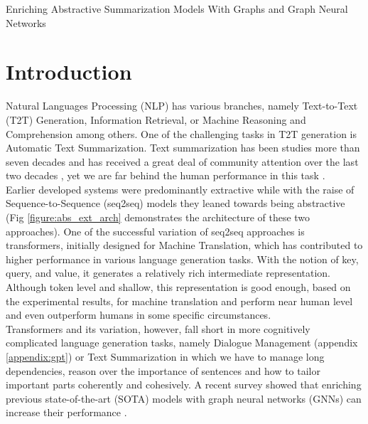 \documentclass[12pt,onecolumn,a4paper]{article}
\begin{document}
\title{\vspace{-5ex}}
\date{\vspace{-5ex}}
\author{\vspace{-5ex}}
\maketitle
\begin{center}
    Enriching Abstractive Summarization Models With Graphs and Graph Neural Networks
\end{center}

\section{Introduction}

Natural Languages Processing (NLP) has various branches, namely Text-to-Text (T2T) Generation, Information Retrieval, or Machine Reasoning and Comprehension among others. One of the challenging tasks in T2T generation is Automatic Text Summarization. Text summarization has been studies more than seven decades and has received a great deal of community attention over the last two decades \citep{Kumar2022}, yet we are far behind the human performance in this task \citep{wafaa}.\\

Earlier developed systems were predominantly extractive while with the raise of Sequence-to-Sequence (seq2seq) models they leaned towards being abstractive\citep{Hou2018} (Fig \ref{figure:abs_ext_arch} demonstrates the architecture of these two approaches). One of the successful variation of seq2seq approaches is transformers\citep{vaswani2017}, initially designed for Machine Translation, which has contributed to higher performance in various language generation tasks. With the notion of key, query, and value, it generates a relatively rich intermediate representation. Although token level and shallow, this representation is good enough, based on the experimental results, for machine translation and perform near human level and even outperform humans in some specific circumstances\citep{Popel2020}.\\

Transformers and its variation, however, fall short in more cognitively complicated language generation tasks, namely Dialogue Management (appendix \ref{appendix:gpt}) or Text Summarization in which we have to manage long dependencies, reason over the importance of sentences and how to tailor important parts coherently and cohesively. A recent survey showed that enriching previous state-of-the-art (SOTA) models with graph neural networks (GNNs) can increase their performance \citep{salchner2022survey}.\\
\end{document}
